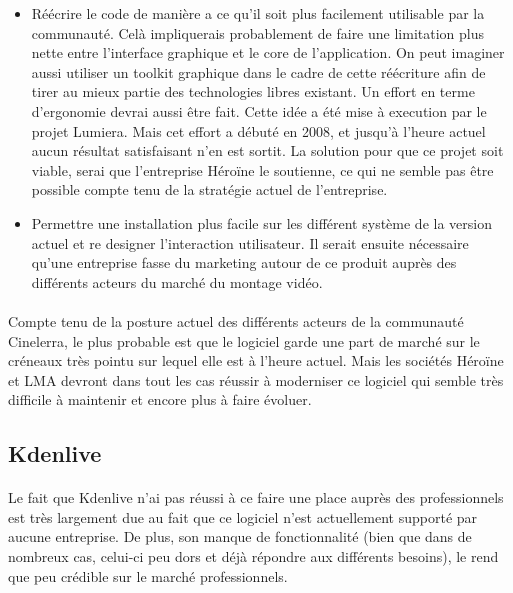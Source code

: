 \begin{itemize}

  \item {Réécrire le code de manière a ce qu'il soit plus facilement
    utilisable par la communauté. Celà impliquerais probablement de
    faire une limitation plus nette entre l'interface graphique et le
    core de l'application. On peut imaginer aussi utiliser un toolkit
    graphique dans le cadre de cette réécriture afin de tirer au
    mieux partie des technologies libres existant. Un effort en terme
    d'ergonomie devrai aussi être fait. Cette idée a été mise à
    execution par le projet Lumiera. Mais cet effort a débuté en
    2008, et jusqu'à l'heure actuel aucun résultat satisfaisant n'en
    est sortit. La solution pour que ce projet soit viable, serai que
    l'entreprise Héroïne le soutienne, ce qui ne semble pas être
    possible compte tenu de la stratégie actuel de l'entreprise.}


  \item {Permettre une installation plus facile sur les différent
  système de
    la version actuel et re designer l'interaction utilisateur. Il serait
    ensuite nécessaire qu'une entreprise fasse du marketing autour de ce
    produit auprès des différents acteurs du marché du montage vidéo.}

\end{itemize}

\paragraph {}

Compte tenu de la posture actuel des différents acteurs de la communauté
Cinelerra, le plus probable est que le logiciel garde une part de marché
sur le créneaux très pointu sur lequel elle est à l'heure actuel. Mais
les sociétés Héroïne et LMA devront dans tout les cas réussir à
moderniser ce logiciel qui semble très difficile à maintenir et encore
plus à faire évoluer.

\subsection {Kdenlive}

\paragraph{} Le fait que Kdenlive n'ai pas réussi à ce faire une
place auprès des professionnels est très largement due au fait que ce
logiciel n'est actuellement supporté par aucune entreprise. De plus,
son manque de fonctionnalité (bien que dans de nombreux cas, celui-ci
peu dors et déjà répondre aux différents besoins), le rend que peu
crédible sur le marché professionnels.

